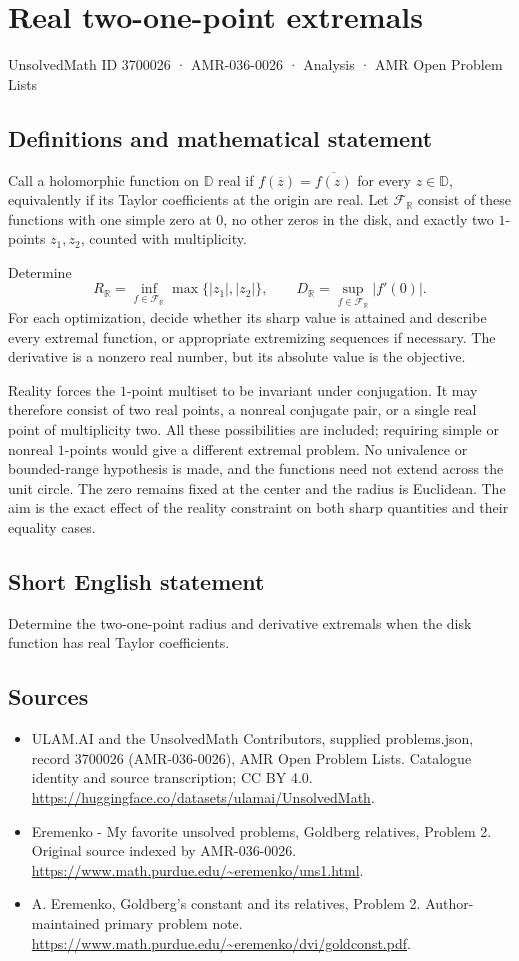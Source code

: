 \documentclass[11pt,a4paper]{article}
\begin{document}
\section*{Real two-one-point extremals}\label{3700026}
{\small UnsolvedMath ID 3700026 · AMR-036-0026 · Analysis · AMR Open Problem Lists}
\subsection{Definitions and mathematical statement}
Call a holomorphic function on $\mathbb D$ real if
$f(\overline z)=\overline{f(z)}$ for every $z\in\mathbb D$,
equivalently if its Taylor coefficients at the origin
are real. Let $\mathcal F_{\mathbb R}$ consist of these
functions with one simple zero at $0$, no other zeros
in the disk, and exactly two $1$-points $z_1,z_2$,
counted with multiplicity.

Determine
\[
 R_{\mathbb R}=\inf_{f\in\mathcal F_{\mathbb R}}
                         \max\{|z_1|,|z_2|\},
 \qquad
 D_{\mathbb R}=\sup_{f\in\mathcal F_{\mathbb R}}|f'(0)|.
\]
For each optimization, decide whether its sharp value
is attained and describe every extremal function, or
appropriate extremizing sequences if necessary.
The derivative is a nonzero real number, but its
absolute value is the objective.

Reality forces the $1$-point multiset to be invariant
under conjugation. It may therefore consist of two
real points, a nonreal conjugate pair, or a single
real point of multiplicity two. All these possibilities
are included; requiring simple or nonreal $1$-points
would give a different extremal problem.
No univalence or bounded-range hypothesis is made,
and the functions need not extend across the unit
circle. The zero remains fixed at the center and
the radius is Euclidean. The aim is the exact effect
of the reality constraint on both sharp quantities
and their equality cases.
\subsection{Short English statement}
Determine the two-one-point radius and derivative extremals when the disk function has real Taylor coefficients.
\subsection{Sources}
\begin{itemize}
\item[S1] ULAM.AI and the UnsolvedMath Contributors, supplied problems.json, record 3700026 (AMR-036-0026), AMR Open Problem Lists. Catalogue identity and source transcription; CC BY 4.0.
\url{https://huggingface.co/datasets/ulamai/UnsolvedMath}.
\item[S2] Eremenko - My favorite unsolved problems, Goldberg relatives, Problem 2. Original source indexed by AMR-036-0026.
\url{https://www.math.purdue.edu/~eremenko/uns1.html}.
\item[S3] A. Eremenko, Goldberg's constant and its relatives, Problem 2. Author-maintained primary problem note.
\url{https://www.math.purdue.edu/~eremenko/dvi/goldconst.pdf}.
\end{itemize}
\end{document}
